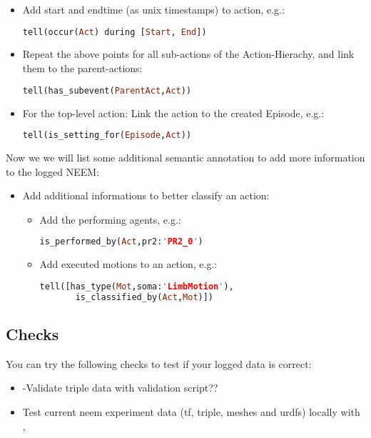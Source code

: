 \begin{itemize}
\begin{itemize}
\begin{lstlisting}[language=Prolog]
			\end{lstlisting}
		\item Add start and endtime (as unix timestamps) to action, e.g.: 
			\begin{lstlisting}[language=Prolog]
tell(occur(Act) during [Start, End])
			\end{lstlisting}
		\item Repeat the above points for all sub-actions of the Action-Hierachy, and link them to the parent-actions:
			\begin{lstlisting}[language=Prolog]
tell(has_subevent(ParentAct,Act))
			\end{lstlisting}
		\item For the top-level action: Link the action to the created Episode, e.g.: 
			\begin{lstlisting}[language=Prolog]
tell(is_setting_for(Episode,Act))
			\end{lstlisting}
	\end{itemize}
\end{itemize}

Now we we will list some additional semantic annotation to add more information to the logged NEEM:

\begin{itemize}
	\item Add additional informations to better classify an action: 
	\begin{itemize}
		\item Add the performing agents, e.g.:
			\begin{lstlisting}[language=Prolog]
is_performed_by(Act,pr2:'PR2_0')
			\end{lstlisting}
		\item Add executed motions to an action, e.g.:
			\begin{lstlisting}[language=Prolog]
tell([has_type(Mot,soma:'LimbMotion'),
       is_classified_by(Act,Mot)])
			\end{lstlisting}
	\end{itemize}
\end{itemize}

\subsection{Checks}


You can try the following checks to test if your logged data is correct:

\begin{itemize}
	\item -Validate triple data with \neem validation script??
	\item Test current neem experiment data (tf, triple, meshes and urdfs) locally with \knowrob, 
\end{itemize}

